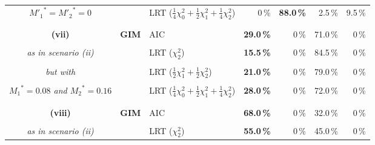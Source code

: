 \documentclass[11pt]{article}
\begin{document}
\begin{table}[!b]
\begin{center}
{\begin{tabular}{|c|c|l|rrrr|}
    ${M'_1}^{*}={M'_2}^{*}=0$        &                & LRT ($\frac{1}{4} \chi^2_0 +\frac{1}{2} \chi^2_1 +\frac{1}{4} \chi^2_2$)                 & 0\,\% & {\bf 88.0\,\%} & 2.5\,\% & 9.5\,\% \\
\vspace*{-2mm} & & & & & &  \\
\hline
\vspace*{-2mm} & & & & & &  \\
{\bf (vii)} & {\bf GIM} & AIC                                                                                                                                       & {\bf 29.0\,\%} & 0\,\% & 71.0\,\% & 0\,\% \\
\vspace*{-3mm} & & & & & &  \\
   {\em as in scenario (ii)}         &                & LRT ($\chi^2_2$)                                                                                                                    & {\bf 15.5\,\%} & 0\,\% & 84.5\,\% & 0\,\% \\ 
\vspace*{-3mm} & & & & & &  \\
  {\em but with}      &                & LRT ($\frac{1}{2} \chi^2_1 +\frac{1}{2} \chi^2_2$)           & {\bf 21.0\,\%} & 0\,\% & 79.0\,\% & 0\,\% \\
\vspace*{-3mm} & & & & & &  \\
    {\em ${M_1}^{\!*}=0.08$ and ${M_2}^{\!*}=0.16$}          &                & LRT ($\frac{1}{4} \chi^2_0 +\frac{1}{2} \chi^2_1 +\frac{1}{4} \chi^2_2$)                                                    & {\bf 28.0\,\%} & 0\,\% & 72.0\,\% & 0\,\%  \\ 
\vspace*{-2mm} & & & & & &  \\
\hline
\vspace*{-2mm} & & & & & &  \\
 {\bf (viii)} & {\bf GIM} & AIC                                                                                                          & {\bf 68.0\,\%} & 0\,\% & 32.0\,\% & 0\,\% \\
\vspace*{-3mm} & & & & & &  \\
   {\em as in scenario (ii)}   &                 & LRT ($\chi^2_2$)                                                                                        & {\bf 55.0\,\%} & 0\,\% & 45.0\,\% & 0\,\% \\

\end{tabular}}
\end{center}
\end{table}
\end{document}

